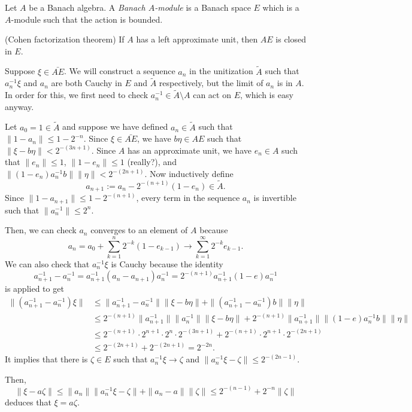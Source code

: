 \documentclass{../../large}
\begin{document}
\begin{prb}
Let $A$ be a Banach algebra.
A \emph{Banach $A$-module} is a Banach space $E$ which is a $A$-module such that the action is bounded.
\begin{parts}
\item (Cohen factorization theorem) If $A$ has a left approximate unit, then $AE$ is closed in $E$.
\end{parts}
\end{prb}
\begin{pf}
Suppose $\xi\in\bar{AE}$.
We will construct a sequence $a_n$ in the unitization $\tilde A$ such that $a_n^{-1}\xi$ and $a_n$ are both Cauchy in $E$ and $\tilde A$ respectively, but the limit of $a_n$ is in $A$.
In order for this, we first need to check $a_n^{-1}\in\tilde A\setminus A$ can act on $E$, which is easy anyway.

Let $a_0=1\in\tilde A$ and suppose we have defined $a_n\in\tilde A$ such that $\|1-a_n\|\le1-2^{-n}$.
Since $\xi\in\bar{AE}$, we have $b\eta\in AE$ such that $\|\xi-b\eta\|<2^{-(3n+1)}$.
Since $A$ has an approximate unit, we have $e_n\in A$ such that $\|e_n\|\le1$, $\|1-e_n\|\le1$ (really?), and $\|(1-e_n)a_n^{-1}b\|\|\eta\|<2^{-(2n+1)}$.
Now inductively define
\[a_{n+1}:=a_n-2^{-(n+1)}(1-e_n)\in\tilde A.\]
Since $\|1-a_{n+1}\|\le1-2^{-(n+1)}$, every term in the sequence $a_n$ is invertible such that $\|a_n^{-1}\|\le2^n$.

Then, we can check $a_n$ converges to an element of $A$ because
\[a_n=a_0+\sum_{k=1}^n2^{-k}(1-e_{k-1})\to\sum_{k=1}^\infty2^{-k}e_{k-1}.\]
We can also check that $a_n^{-1}\xi$ is Cauchy because the identity
\[a_{n+1}^{-1}-a_n^{-1}=a_{n+1}^{-1}(a_n-a_{n+1})a_n^{-1}=2^{-(n+1)}a_{n+1}^{-1}(1-e)a_n^{-1}\]
is applied to get
\begin{align*}
\|(a_{n+1}^{-1}-a_n^{-1})\xi\|
&\le\|a_{n+1}^{-1}-a_n^{-1}\|\|\xi-b\eta\|+\|(a_{n+1}^{-1}-a_n^{-1})b\|\|\eta\|\\
&\le2^{-(n+1)}\|a_{n+1}^{-1}\|\|a_n^{-1}\|\|\xi-b\eta\|+2^{-(n+1)}\|a_{n+1}^{-1}\|\|(1-e)a_n^{-1}b\|\|\eta\|\\
&\le2^{-(n+1)}\cdot2^{n+1}\cdot2^n\cdot2^{-(3n+1)}+2^{-(n+1)}\cdot2^{n+1}\cdot2^{-(2n+1)}\\
&\le2^{-(2n+1)}+2^{-(2n+1)}=2^{-2n}.
\end{align*}
It implies that there is $\zeta\in E$ such that $a_n^{-1}\xi\to\zeta$ and $\|a_n^{-1}\xi-\zeta\|\le2^{-(2n-1)}$.

Then,
\[\|\xi-a\zeta\|\le\|a_n\|\|a_n^{-1}\xi-\zeta\|+\|a_n-a\|\|\zeta\|\le2^{-(n-1)}+2^{-n}\|\zeta\|\]
deduces that $\xi=a\zeta$.
\end{pf}
\end{document}
